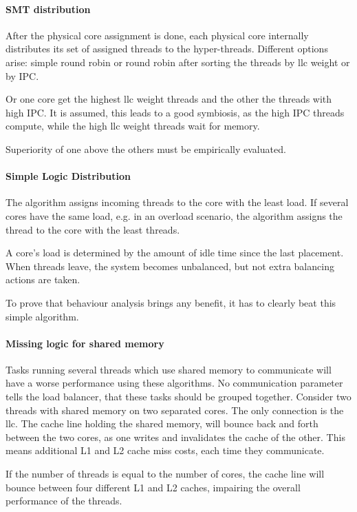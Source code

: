 \paragraph{SMT distribution}
After the physical core assignment is done, each physical core internally
distributes its set of assigned threads to the hyper-threads.
Different options arise: simple round robin or round robin after sorting the
threads by \gls{llc} weight or by IPC.

Or one core get the highest \gls{llc} weight threads and the other the threads
with high IPC.
It is assumed, this leads to a good symbiosis, as the high IPC threads compute,
while the high \gls{llc} weight threads wait for memory.

Superiority of one above the others must be empirically evaluated.


\paragraph{Simple Logic Distribution}
The algorithm assigns incoming threads to the core with the least load.
If several cores have the same load, e.g. in an overload scenario, the
algorithm assigns the thread to the core with the least threads.

A core's load is determined by the amount of idle time since the last
placement.
When threads leave, the system becomes unbalanced, but not extra balancing
actions are taken.

To prove that behaviour analysis brings any benefit, it has to clearly beat
this simple algorithm.


\paragraph{Missing logic for shared memory}
Tasks running several threads which use shared memory to communicate will have
a worse performance using these algorithms.
No communication parameter tells the load balancer, that these tasks should be
grouped together.
Consider two threads with shared memory on two separated cores.
The only connection is the \gls{llc}.
The cache line holding the shared memory, will bounce back and forth between
the two cores, as one writes and invalidates the cache of the other.
This means additional L1 and L2 cache miss costs, each time they communicate.

If the number of threads is equal to the number of cores, the cache line will
bounce between four different L1 and L2 caches, impairing the overall
performance of the threads.

